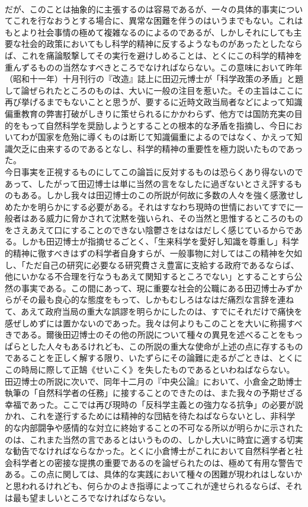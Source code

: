 \documentclass[8pt]{extreport}
\begin{document}
\begin{CJK}{UTF8}{min}
\\	だが、このことは抽象的に主張するのは容易であるが、一々の具体的事実についてこれを行なおうとする場合に、異常な困難を伴うのはいうまでもない。これはもとより社会事情の極めて複雑なるのによるのであるが、しかしそれにしても主要な社会的政策においてもし科学的精神に反するようなものがあったとしたならば、これを痛論駁撃してその実行を避けしめることは、とくにこの科学的精神を重んずるものの当然なすべきところでなければならない。この意味において昨年（昭和十一年）十月刊行の『改造』誌上に田辺元博士が「科学政策の矛盾」と題して論ぜられたところのものは、大いに一般の注目を惹いた。その主旨はここに再び挙げるまでもないことと思うが、要するに近時文政当局者などによって知識偏重教育の弊害打破がしきりに策せられるにかかわらず、他方では国防充実の目的をもって自然科学を奨励しようとすることの根本的な矛盾を指摘し、今日においてわが国家を危殆に導くものは断じて知識偏重によるのではなく、かえって知識欠乏に由来するのであるとなし、科学的精神の重要性を極力説いたものであった。
\\	今日事実を正視するものにしてこの論旨に反対するものは恐らくあり得ないのであって、したがって田辺博士は単に当然の言をなしたに過ぎないとさえ評するものもある。しかし我々は田辺博士のこの所説が何故に多数の人々を強く感激せしめたかを明らかにする必要がある。それはすなわち現時の世情においてすでに一般者はある威力に脅かされて沈黙を強いられ、その当然と思惟するところのものをさえあえて口にすることのできない陰鬱さをはなはだしく感じているからである。しかも田辺博士が指摘せるごとく、「生来科学を愛好し知識を尊重し」科学的精神に徹すべきはずの科学者自身すらが、一般事物に対してはこの精神を欠如し、「ただ自己の研究に必要なる研究費さえ豊富に支給する政府であるならば、他にいかなる不合理を行なうもあえて関知するところでない」とすることすら公然の事実である。この間にあって、現に重要な社会的公職にある田辺博士みずからがその最も良心的な態度をもって、しかもむしろはなはだ痛烈な言辞を連ねて、あえて政府当局の重大な誤謬を明らかにしたのは、すでにそれだけで痛快を感ぜしめずには置かないのであった。我々は何よりもこのことを大いに称揚すべきである。爾後田辺博士のその他の所説について種々の異見を述べることをもっぱらとした人々もあるけれども、この所説の重大な使命が上述の点に存するものであることを正しく解する限り、いたずらにその論難に走るがごときは、とくにこの時局に際して正鵠《せいこく》を失したものであるといわねばならない。
\\	田辺博士の所説に次いで、同年十二月の『中央公論』において、小倉金之助博士執筆の「自然科学者の任務」に接することのできたのは、また我々の予期せざる幸福であった。ここでは再び現時の「反科学主義との強力なる抗争」の必要が説かれ、これを遂行するためには精神的な団結を待たねばならないとし、非科学的な内部闘争や感情的な対立に終始することの不可なる所以が明らかに示されたのは、これまた当然の言であるとはいうものの、しかし大いに時宜に適する切実な勧告でなければならなかった。とくに小倉博士がこれにおいて自然科学者と社会科学者との密接な提携の重要であるのを論ぜられたのは、極めて有用な警告である。この点に関しては、具体的な実践において種々の困難が現われはしないかと思われるけれども、何らかのよき指導によってこれが達せられるならば、それは最も望ましいところでなければならない。

\end{CJK}
\end{document}

